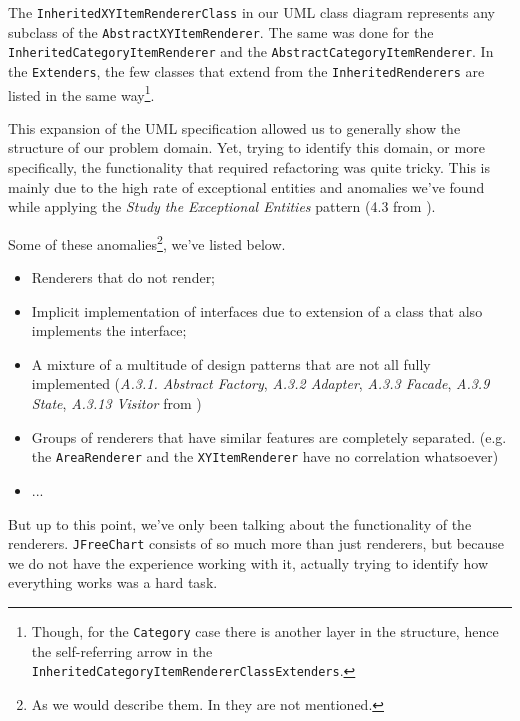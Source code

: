 \documentclass[11pt]{article}
\begin{document}
	The \texttt{InheritedXYItemRendererClass} in our UML class diagram represents any subclass of the \texttt{AbstractXYItemRenderer}. The same was done for the \texttt{InheritedCategoryItemRenderer} and the \texttt{AbstractCategoryItemRenderer}. In the \texttt{Extenders}, the few classes that extend from the \texttt{InheritedRenderers} are listed in the same way\footnote{Though, for the \texttt{Category} case there is another layer in the structure, hence the self-referring arrow in the \texttt{InheritedCategoryItemRendererClassExtenders}.}.
	
	This expansion of the UML specification allowed us to generally show the structure of our problem domain. Yet, trying to identify this domain, or more specifically, the functionality that required refactoring was quite tricky. This is mainly due to the high rate of exceptional entities and anomalies we've found while applying the \textsl{Study the Exceptional Entities} pattern (4.3 from \cite{demeyer2009object}).
	
	Some of these anomalies\footnote{As we would describe them. In \cite{demeyer2009object} they are not mentioned.}, we've listed below.
	\begin{itemize}
		\item Renderers that do not render;
		\item Implicit implementation of interfaces due to extension of a class that also implements the interface;
		\item A mixture of a multitude of design patterns that are not all fully implemented (\textsl{A.3.1. Abstract Factory}, \textsl{A.3.2 Adapter}, \textsl{A.3.3 Facade}, \textsl{A.3.9 State}, \textsl{A.3.13 Visitor} from \cite{demeyer2009object})
		\item Groups of renderers that have similar features are completely separated. (e.g. the \texttt{AreaRenderer} and the \texttt{XYItemRenderer} have no correlation whatsoever)
		\item ...
	\end{itemize}

	But up to this point, we've only been talking about the functionality of the renderers. \texttt{JFreeChart} consists of so much more than just renderers, but because we do not have the experience working with it, actually trying to identify how everything works was a hard task.
	
\end{document}
